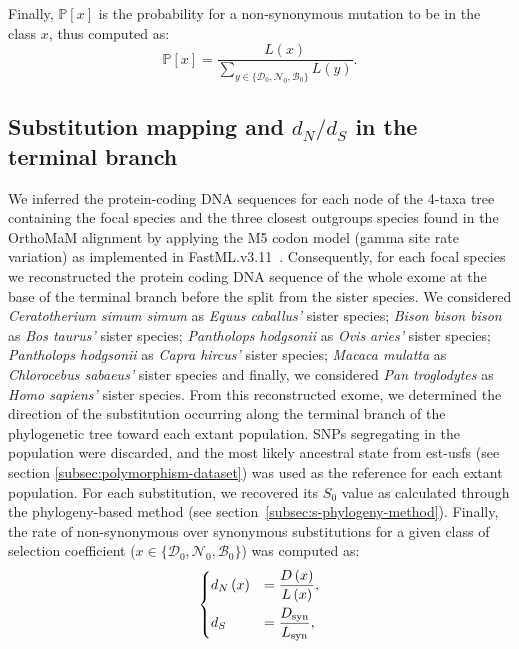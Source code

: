 \documentclass{article}
\newcommand{\proba}{\mathbb{P}}
\newcommand{\dn}{d_N}
\newcommand{\ds}{d_S}
\newcommand{\dnds}{\dn / \ds}
\newcommand{\Sphy}{S_{0}}
\newcommand{\SphyDel}{\mathcal{D}_0}
\newcommand{\SphyNeu}{\mathcal{N}_0}
\newcommand{\SphyBen}{\mathcal{B}_0}
\newcommand{\Sphyclass}{x}
\newcommand{\SphyclassAlt}{y}
\begin{document}
    Finally, $\proba [ \Sphyclass ]$ is the probability for a non-synonymous mutation to be in the class $\Sphyclass$, thus computed as:
    \begin{equation}
        \proba[\Sphyclass] = \frac{L\left( \Sphyclass \right)}{\sum_{\SphyclassAlt\in \{\SphyDel, \SphyNeu, \SphyBen \} } L\left(\SphyclassAlt \right)}.\label{eq:proba-dfe-mutsel}
    \end{equation}

    \subsection{Substitution mapping and $\dnds$ in the terminal branch}
    \label{subsec:substitution-mapping-in-the-terminal-branch}
    We inferred the protein-coding DNA sequences for each node of the 4-taxa tree containing the focal species and the three closest outgroups species found in the OrthoMaM alignment by applying the M5 codon model (gamma site rate variation) as implemented in FastML.v3.11~\cite{ashkenazy_fastml_2012}.
    Consequently, for each focal species we reconstructed the protein coding DNA sequence of the whole exome at the base of the terminal branch before the split from the sister species.
    We considered \textit{Ceratotherium simum simum} as \textit{Equus caballus'} sister species; \textit{Bison bison bison} as \textit{Bos taurus'} sister species; \textit{Pantholops hodgsonii} as \textit{Ovis aries'} sister species; \textit{Pantholops hodgsonii} as \textit{Capra hircus'} sister species; \textit{Macaca mulatta} as \textit{Chlorocebus sabaeus'} sister species and finally, we considered \textit{Pan troglodytes} as \textit{Homo sapiens'} sister species.
    From this reconstructed exome, we determined the direction of the substitution occurring along the terminal branch of the phylogenetic tree toward each extant population.
    SNPs segregating in the population were discarded, and the most likely ancestral state from est-usfs (see section \ref{subsec:polymorphism-dataset}) was used as the reference for each extant population.
    For each substitution, we recovered its $\Sphy$ value as calculated through the phylogeny-based method (see section~\ref{subsec:s-phylogeny-method}).
    Finally, the rate of non-synonymous over synonymous substitutions for a given class of selection coefficient ($\Sphyclass \in \{\SphyDel, \SphyNeu, \SphyBen \}$) was computed as:
    \begin{align}
        \begin{dcases}
            \dn \left( \Sphyclass \right) &= \dfrac{D\left( \Sphyclass \right)}{L \left( \Sphyclass \right)}, \\
            \ds &= \dfrac{D_{\text{syn}}}{L_{\text{syn}}},
        \end{dcases}\label{eq:dnds}
    \end{align}
\end{document}
